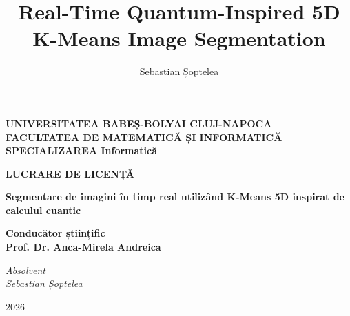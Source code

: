 \documentclass[12pt]{report}
\begin{document}
\title{Real-Time Quantum-Inspired 5D K-Means Image Segmentation}                     
\author{Sebastian Șoptelea}                                            
                
\hypersetup{pageanchor=false}
\maketitle
\newpage

\begin{titlepage}
\begin{center}
{\Large\textbf{
UNIVERSITATEA BABEȘ-BOLYAI CLUJ-NAPOCA \\
FACULTATEA DE MATEMATICĂ ȘI INFORMATICĂ \\
SPECIALIZAREA Informatică \\
}}
\end{center}

\vspace{8em}

\begin{center}
{\Huge\textbf{
LUCRARE DE LICENȚĂ
}}
\end{center}

\vspace{2.5em}

\begin{center}
{\huge\textbf{Segmentare de imagini în timp real utilizând K-Means 5D inspirat de calculul cuantic}}
\end{center}

\vspace{8em}

\begin{flushleft}
{\Large\textbf{
Conducător științific \\ Prof. Dr. Anca-Mirela Andreica
}}
\end{flushleft}

\vspace{2.5em}

\begin{flushright}
{\Large\textit{
Absolvent\\ Sebastian Șoptelea
}}
\end{flushright}

\vfill

\begin{center}
{\Large{2026}}
\end{center}
\end{titlepage}
\newpage
\end{document}
